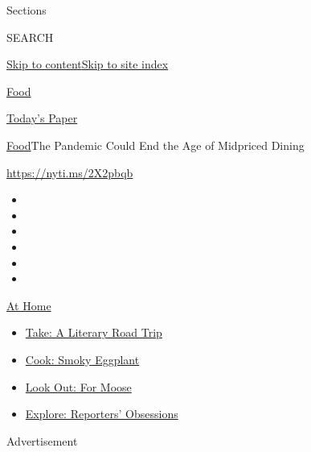 Sections

SEARCH

\protect\hyperlink{site-content}{Skip to
content}\protect\hyperlink{site-index}{Skip to site index}

\href{https://www.nytimes.com/section/food}{Food}

\href{https://myaccount.nytimes.com/auth/login?response_type=cookie\&client_id=vi}{}

\href{https://www.nytimes.com/section/todayspaper}{Today's Paper}

\href{/section/food}{Food}\textbar{}The Pandemic Could End the Age of
Midpriced Dining

\url{https://nyti.ms/2X2pbqb}

\begin{itemize}
\item
\item
\item
\item
\item
\item
\end{itemize}

\href{https://www.nytimes.com/spotlight/at-home?action=click\&pgtype=Article\&state=default\&region=TOP_BANNER\&context=at_home_menu}{At
Home}

\begin{itemize}
\tightlist
\item
  \href{https://www.nytimes.com/2020/07/28/books/time-for-a-literary-road-trip.html?action=click\&pgtype=Article\&state=default\&region=TOP_BANNER\&context=at_home_menu}{Take:
  A Literary Road Trip}
\item
  \href{https://www.nytimes.com/2020/07/29/magazine/bored-with-your-home-cooking-some-smoky-eggplant-will-fix-that.html?action=click\&pgtype=Article\&state=default\&region=TOP_BANNER\&context=at_home_menu}{Cook:
  Smoky Eggplant}
\item
  \href{https://www.nytimes.com/2020/07/27/travel/moose-michigan-isle-royale.html?action=click\&pgtype=Article\&state=default\&region=TOP_BANNER\&context=at_home_menu}{Look
  Out: For Moose}
\item
  \href{https://www.nytimes.com/interactive/2020/at-home/even-more-reporters-editors-diaries-lists-recommendations.html?action=click\&pgtype=Article\&state=default\&region=TOP_BANNER\&context=at_home_menu}{Explore:
  Reporters' Obsessions}
\end{itemize}

Advertisement

